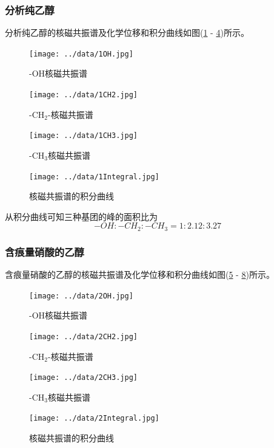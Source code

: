 \documentclass[a4paper]{article}
\begin{document}
\subsubsection{分析纯乙醇}
分析纯乙醇的核磁共振谱及化学位移和积分曲线如图(\ref{1OH} - \ref{1Integral})所示。
\begin{figure}[!h]
\centering
\texttt{[image: ../data/1OH.jpg]}\\
\caption{-OH核磁共振谱}\label{1OH}
\end{figure}
\begin{figure}[!h]
\centering
\texttt{[image: ../data/1CH2.jpg]}\\
\caption{-CH$_2$-核磁共振谱}\label{1CH2}
\end{figure}
\begin{figure}[!h]
\centering
\texttt{[image: ../data/1CH3.jpg]}\\
\caption{-CH$_3$核磁共振谱}\label{1CH3}
\end{figure}
\begin{figure}[!h]
\centering
\texttt{[image: ../data/1Integral.jpg]}\\
\caption{核磁共振谱的积分曲线}\label{1Integral}
\end{figure}

从积分曲线可知三种基团的峰的面积比为
\begin{equation*}
-OH : -CH_2 : -CH_3 = 1 : 2.12 : 3.27
\end{equation*}

\newpage
\subsubsection{含痕量硝酸的乙醇}
含痕量硝酸的乙醇的核磁共振谱及化学位移和积分曲线如图(\ref{2OH} - \ref{2Integral})所示。
\begin{figure}[!h]
\centering
\texttt{[image: ../data/2OH.jpg]}\\
\caption{-OH核磁共振谱}\label{2OH}
\end{figure}
\begin{figure}[!h]
\centering
\texttt{[image: ../data/2CH2.jpg]}\\
\caption{-CH$_2$-核磁共振谱}\label{2CH2}
\end{figure}
\begin{figure}[!h]
\centering
\texttt{[image: ../data/2CH3.jpg]}\\
\caption{-CH$_3$核磁共振谱}\label{2CH3}
\end{figure}
\begin{figure}[!h]
\centering
\texttt{[image: ../data/2Integral.jpg]}\\
\caption{核磁共振谱的积分曲线}\label{2Integral}
\end{figure}
\end{document}
